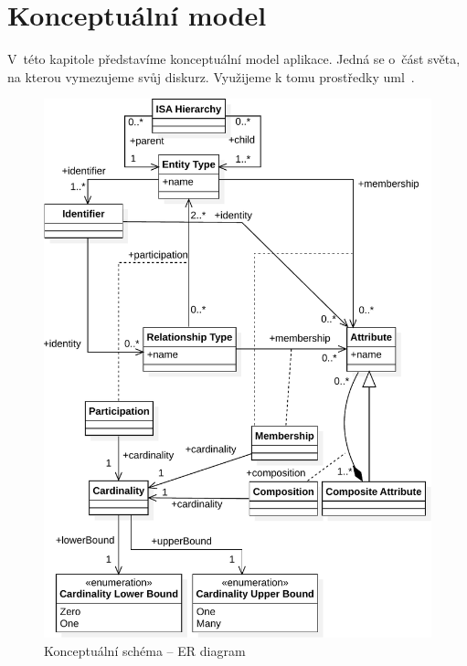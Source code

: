 \section{Konceptuální model}\label{section:conceptual-model}

V~této kapitole představíme konceptuální model aplikace.
Jedná se o~část světa, na kterou vymezujeme svůj diskurz.
Využijeme k tomu prostředky \acrfull{uml}~\cite{omg_uml_2017}.

\begin{figure}[!htb]
  \centering
  \includegraphics[width=\maxwidth{\textwidth}]{../img/diagrams/er-diagram-model.pdf}
  \caption{Konceptuální schéma -- ER diagram}
  \label{fig:class-diagram:er-diagram}
\end{figure}


